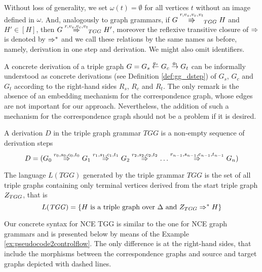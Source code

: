 \documentclass[runningheads]{llncs}
\begin{document}
Without loss of generality, we set $\omega(t) = \emptyset$ for all vertices $t$ without an image defined in $\omega$. And, analogously to graph grammars, if $G \cderiv{r}{v_s,v_c,v_t}{TGG} H$ and $H' \in [H]$, then $G \tderiv{r}{v_s,v_c,v_t}{TGG} H'$, moreover the reflexive transitive closure of $\tderiv{}{}{}$ is denoted by $\Rightarrow^*_{}$ and we call these relations by the same names as before, namely, derivation in one step and derivation. We might also omit identifiers.

A concrete derivation of a triple graph $G = G_s \overset{g_s}{\leftarrow} G_c \overset{g_t}{\rightarrow} G_t$ can be informally understood as concrete derivations (see Definition \ref{def:gg_dstep}) of $G_s$, $G_c$ and $G_t$ according to the right-hand sides $R_s$, $R_c$ and $R_t$. The only remark is the absence of an embedding mechanism for the correspondence graph, whose edges are not important for our approach. Nevertheless, the addition of such a mechanism for the correspondence graph should not be a problem if it is desired.

\begin{definition}
	A derivation $D$ in the triple graph grammar $\mathit{TGG}$ is a non-empty sequence of derivation steps
	\begin{equation*}
		D = (G_0 \tderiv{r_0}{s_0,c_0,t_0}{} G_1 \tderiv{r_1}{s_1,c_1,t_1}{} G_2 \tderiv{r_2}{s_2,c_2,t_2}{} \dots \tderiv{r_{n-1}}{s_{n-1},c_{n-1},t_{n-1}}{} G_n)
	\end{equation*}
\end{definition}

\begin{definition}
	\label{def:tlanguage}
	The language $L(\mathit{TGG})$ generated by the triple grammar $\mathit{TGG}$ is the set of all triple graphs containing only terminal vertices derived from the start triple graph $Z_{TGG}$, that is
	\begin{equation*}
		L(\mathit{TGG}) = \{H \text{ is a triple graph over } \Delta \text{ and } Z_{TGG} \Rightarrow^*_{} H\}
	\end{equation*}
\end{definition}

Our concrete syntax for NCE TGG is similar to the one for NCE graph grammars and is presented below by means of the Example \ref{ex:pseudocode2controlflow}. The only difference is at the right-hand sides, that include the morphisms between the correspondence graphs and source and target graphs depicted with dashed lines.
\end{document}
